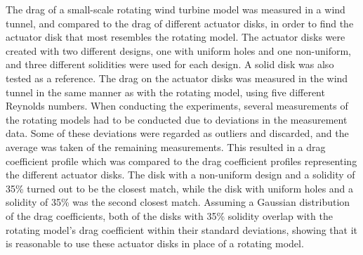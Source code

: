 The drag of a small-scale rotating wind turbine model was measured in a wind tunnel, and compared to the drag of different actuator disks, in order to find the actuator disk that most resembles the rotating model. The actuator disks were created with two different designs, one with uniform holes and one non-uniform, and three different solidities were used for each design. A solid disk was also tested as a reference. The drag on the actuator disks was measured in the wind tunnel in the same manner as with the rotating model, using five different Reynolds numbers. When conducting the experiments, several measurements of the rotating models had to be conducted due to deviations in the measurement data. Some of these deviations were regarded as outliers and discarded, and the average was taken of the remaining measurements. This resulted in a drag coefficient profile which was compared to the drag coefficient profiles representing the different actuator disks. The disk with a non-uniform design and a solidity of 35\% turned out to be the closest match, while the disk with uniform holes and a solidity of 35\% was the second closest match. Assuming a Gaussian distribution of the drag coefficients, both of the disks with 35\% solidity overlap with the rotating model's drag coefficient within their standard deviations, showing that it is reasonable to use these actuator disks in place of a rotating model. 
















